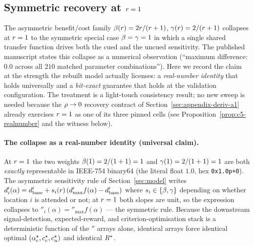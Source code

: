 \subsection{Symmetric recovery at $r = 1$}
\label{sec:appendix-c5}

The asymmetric benefit/cost family
$\beta(r) = 2r/(r+1)$,
$\gamma(r) = 2/(r+1)$ collapses at $r = 1$ to the
symmetric special case $\beta = \gamma = 1$ in which a single
shared transfer function drives both the cued and the uncued
sensitivity. The published manuscript states this collapse as a
numerical observation (``maximum difference: $0.0$ across all $210$
matched parameter combinations''). Here we record the claim at the
strength the rebuilt model actually licenses: a \emph{real-number
identity} that holds universally and a \emph{bit-exact} guarantee that
holds at the validation configuration. The treatment is a light-touch
consistency result; no new sweep is needed because the
$\rho \to 0$ recovery contract of
Section~\ref{sec:appendix-deriv-a1} already exercises $r = 1$ as
one of its three pinned cells (see Proposition~\ref{prop:c5-realnumber}
and the witness below).

\paragraph{The collapse as a real-number identity (universal claim).}
At $r = 1$ the two weights $\beta(1) = 2/(1+1) = 1$ and
$\gamma(1) = 2/(1+1) = 1$ are both \emph{exactly} representable in
IEEE-754 binary64 (the literal float $1.0$, hex \texttt{0x1.0p+0}).
The asymmetric sensitivity rule of Section~\ref{sec:model} writes
$d'_i(\alpha) =
 d'_{\mathrm{base}} +
 s_i(r)\,(d'_{\max} f(\alpha) - d'_{\mathrm{base}})$
where $s_i \in \{\beta, \gamma\}$ depending on whether location $i$
is attended or not; at $r = 1$ both slopes are unit, so the
expression collapses to $\dprime_i(\alpha) = \dprime_{\max} f(\alpha)$
--- the symmetric rule. Because the downstream signal-detection,
expected-reward, and criterion-optimisation stack is a deterministic
function of the $\dprime$ arrays alone, identical arrays force
identical optimal $(\alpha_c^\star, c_c^\star, c_u^\star)$ and
identical $R^\star$.

